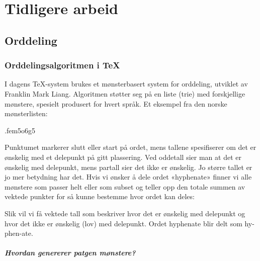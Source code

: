\chapter{Tidligere arbeid}

\section{Orddeling}
\label{sec:tid-arb-orddeling}

\subsection{Orddelingsalgoritmen i \TeX{}}

I dagens \TeX{}-system brukes et mønsterbasert system for orddeling, utviklet av Franklin Mark Liang\cite{liang1983word}. Algoritmen\cite[s.~449--450]{knuth1986texbook} støtter seg på en liste (trie) med forskjellige mønstere, spesielt produsert for hvert språk. Et eksempel fra den norske mønsterlisten:

.fem5o6g5

Punktumet markerer slutt eller start på ordet, mens tallene spesifiserer om det er ønskelig med et delepunkt på gitt plassering. Ved oddetall sier man at det er ønskelig med delepunkt, mens partall sier det ikke er ønskelig. Jo større tallet er jo mer betydning har det. Hvis vi ønsker å dele ordet «hyphenate» finner vi alle mønstere som passer helt eller som subset og teller opp den totale summen av vektede punkter for så kunne bestemme hvor ordet kan deles:

\newline
{}\newline
{}\newline
{}\newline
{}\newline
{}\newline
{}\newline
{}\newline
{}

Slik vil vi få vektede tall som beskriver hvor det er ønskelig med delepunkt og hvor det ikke er ønskelig (lov) med delepunkt. Ordet hyphenate blir delt som hy-phen-ate.

\paragraph{Hvordan genererer patgen mønstere?}

